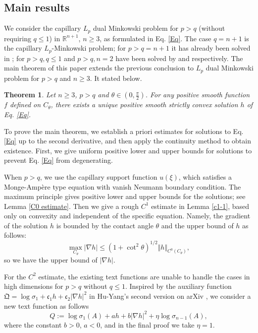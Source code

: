 \documentclass[11pt]{amsart}
\newcommand{\rt}{\mathrm{tr}}
\def\R{{\mathfrak R}}
\def\R{\mathbb R}
\numberwithin{equation} {section}
\numberwithin{equation}{section}
\newtheorem{theorem}{\bf Theorem}[section]
\begin{document}
\subsection{Main results}

We consider the capillary $L_p$ dual Minkowski problem for $p>q$ (without requiring $q\leq 1$) in $\R^{n+1}$, $n\geq 3$, as formulated in Eq. \eqref{Eq}. The case $q=n+1$ is the capillary $L_p$-Minkowski problem; for $p>q=n+1$ it has already been solved in \cite{MWW25b}; for $p>q, q\leq 1$ and $p>q, n=2$ have been solved by \cite{GY26v2} and \cite{HY26} respectively. The main theorem of this paper extends the previous conclusion to $L_p$ dual Minkowski problem for $p>q$ and $n\geq 3$. It stated below.

\begin{theorem}\label{main1.1}
Let $n\geq 3$, $p>q$ and $\theta\in (0, \frac{\pi}{2})$. For any positive smooth function $f$ defined on $C_{\theta}$, there exists a unique positive smooth strictly convex solution $h$ of Eq. \eqref{Eq}. 
\end{theorem}

To prove the main theorem, we establish a priori estimates for solutions to Eq. \eqref{Eq} up to the second derivative, and then apply the continuity method to obtain existence. First, we give uniform positive lower and upper bounds for solutions to prevent Eq. \eqref{Eq} from degenerating.

When $p>q$, we use the capillary support function $u(\xi)$, which satisfies a Monge-Amp\`ere type equation with vanish Neumann boundary condition. The maximum principle gives positive lower and upper bounds for the solutions; see Lemma \ref{C0 estimate}. Then we give a rough $C^1$ estimate in Lemma \ref{c1-1}, based only on convexity and independent of the specific equation. Namely, the gradient of the solution $h$ is bounded by the contact angle $\theta$ and the upper bound of $h$ as follows:
$$\max_{C_{\theta}}|\nabla h|\leq (1+\cot^2\theta)^{1/2}\Vert h\Vert_{C^0 (C_{\theta})},$$
so we have the upper bound of $|\nabla h|$. 

For the $C^2$ estimate, the existing text functions are unable to handle the cases in high dimensions for $p>q$ without $q\leq 1$. Inspired by the auxiliary function $\mathfrak{Q}=\log\sigma_1 +\mathfrak{c}_1h +\mathfrak{c}_2 | \nabla h|^2$ in Hu-Yang's second version on arXiv \cite{HY26}, we consider a new text function as follows
$$Q:=\log\sigma_1(A)+a h+b|\nabla h|^2+\eta\log\sigma_{n-1}(A),$$
where the constant $b>0$, $a<0$, and in the final proof we take $\eta=1$. %
\end{document}
